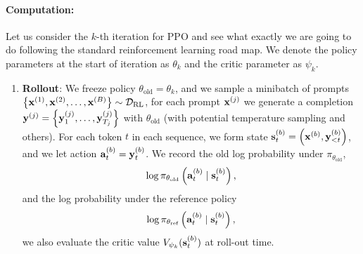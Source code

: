\documentclass[11pt]{article}  %
\begin{document}
\paragraph{Computation:} 
Let us consider the $k$-th iteration for PPO and see what exactly we are going to do following the standard reinforcement learning road map.
We denote the policy parameters at the start of iteration as $\theta_k$ and the critic parameter as $\psi_k$.
\begin{enumerate}
  \item \textbf{Rollout}: We freeze policy $\theta_{\text{old}} = \theta_k$, and we sample a minibatch of prompts $\left\{ \mathbf{x}^{(1)}, \mathbf{x}^{(2)}, \hdots, \mathbf{x}^{(B)} \right\} \sim \mathcal{D}_{\text{RL}}$, for each prompt $\mathbf{x}^{(j)}$ we generate a completion $\mathbf{y}^{(j)} = \left\{ \mathbf{y}_1^{(j)}, \hdots, \mathbf{y}_{T_j}^{(j)} \right\}$ with $\theta_{\text{old}}$ (with potential temperature sampling and others).
  For each token $t$ in each sequence, we form state $\mathbf{s}_t^{(b)} = \left( \mathbf{x}^{(b)}, \mathbf{y}^{(b)}_{< t} \right)$, and we let action $\mathbf{a}^{(b)}_t = \mathbf{y}_t^{(b)}$.
  We record the old log probability under $\pi_{\theta_{\text{old}}}$, 
  \begin{align*}
    \log \pi_{\theta_{\text{old}}}\left( \mathbf{a}^{(b)}_t \mid \mathbf{s}^{(b)}_{t} \right),
  \end{align*}
  and the log probability under the reference policy 
  \begin{align*}
    \log \pi_{\theta_{\text{ref}}}\left( \mathbf{a}^{(b)}_t \mid \mathbf{s}^{(b)}_{t} \right),
  \end{align*}
  we also evaluate the critic value $V_{\psi_k}(\mathbf{s}^{(b)}_t)$ at roll-out time.
  

\end{enumerate}
\end{document}
